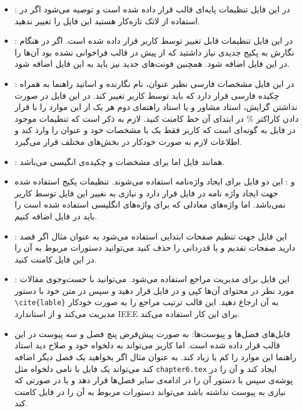 \begin{itemize}
	\item {}: 
	در این فایل تنظیمات پایه‌ای قالب قرار داده شده است 
	و توصیه می‌شود اگر در استفاده از لاتک تازه‌کار هستید
	این فایل را تغییر ندهید.
	\item {}:
	در این فایل تنظیمات قابل تغییر توسط کاربر قرار داده شده است.
	اگر در هنگام نگارش به پکیج جدیدی نیاز داشتید که از پیش در قالب
	فراخوانی نشده بود آن‌ها را در این فایل اضافه شود. همچنین فونت‌های
	جدید نیز یاید به این فایل اضافه شود.
	\item {}:
	در این فایل مشخصات فارسی نظیر عنوان، نام نگارنده و 
	اساتید راهنما به همراه چکیده فارسی قرار دارد 
	که باید توسط کاربر تغییر کند. در این فایل در صورت
	نداشتن گرایش، استاد مشاور و یا استاد راهنمای دوم هر
	یک از این موارد را با قرار دادن کاراکتر
	\%
	در ابتدای آن خط کامنت کنید. لازم به ذکر است که تنظیمات
	موجود در فایل
	به گونه‌ای است که کاربر فقط یک با مشخصات خود و عنوان
	را وارد کند و اطلاعات لازم به صورت خودکار در بخش‌های 
	مختلف قرار می‌گیرد. 
	\item {}:
	همانند فایل
	اما برای مشخصات و چکیده‌ی انگیسی می‌باشد.
	\item {}
	و
	:
	این دو فایل برای ایجاد واژه‌نامه استفاده می‌شوند.
	تنظیمات پکیج استفاده شده جهت ایجاد واژه نامه در فایل
	قرار دارد و نیازی به نغییر این فایل توسط کاریر نمی‌باشد.
	اما واژه‌های معادلی که برای واژه‌های انگلیسی استفاده شده
	است را باید در فایل  
	اضافه کنیم.
	\item {}:
	این فایل جهت تنظیم صفحات ابتدایی استفاده می‌شود به
	عنوان مثال اگر	قصد دارید صفحات تفدیم و یا قدردانی
	را حذف کنید می‌توانید دستورات	مربوط به آن را در این
	فایل کامنت کنید.
	\item {}:
	این فایل برای مدیریت مراجع استفاده می‌شود. می‌توانید
	با جست‌و‌جوی مقالات مورد نظر در 
	محتوای
	آن‌ها کپی و در فایل
	قرار دهید و سپس در متن خود با دستور
	\verb*|\cite{lable}|
	به آن ارجاع دهید. این قالب ترتیب مراجع را به
	صورت خودکار مدیریت می‌کند و از استاندارد ‌IEEE 
	برای این کار استفاده می‌کند.
	
	\item
	 فایل‌های فصل‌ها و پیوست‌ها: به صورت پیش‌فرض پنچ
	 فصل و سه پیوست در این قالب قرار داده شده است.
	 اما کاربر می‌تواند به دلخواه خود و صلاح دید استاد
	 راهنما این موارد را کم یا زیاد کند. به عنوان 
	 مثال اگر بخواهید یک فصل دیگر اضافه کند می‌تواند
	 یک فایل با نامی دلخواه مثل
	 \verb*|chapter6.tex|
	 ایجاد کند و آن را در پوشه‌ی 
	 سپس با دستور
	 \verb*||
	آن را در ادامه‌‌ی سایر فصل‌ها قرار دهد و یا در صورتی
	که نیازی به پیوست نداشته باشد می‌تواند دستورات مربوط
	به آن را در فایل 
	کامنت کند.

\end{itemize}

